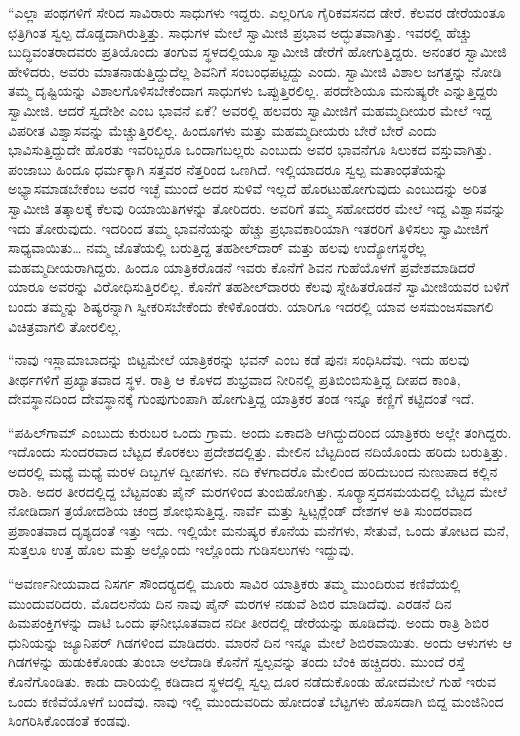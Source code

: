  “ಎಲ್ಲಾ ಪಂಥಗಳಿಗೆ ಸೇರಿದ ಸಾವಿರಾರು ಸಾಧುಗಳು ಇದ್ದರು. ಎಲ್ಲರಿಗೂ ಗೈರಿಕವಸನದ ಡೇರೆ. ಕೆಲವರ ಡೇರೆಯಂತೂ ಛತ್ರಿಗಿಂತ ಸ್ವಲ್ಪ ದೊಡ್ಡದಾಗಿರುತ್ತಿತ್ತು. ಸಾಧುಗಳ ಮೇಲೆ ಸ್ವಾಮೀಜಿ ಪ್ರಭಾವ ಅದ್ಭುತವಾಗಿತ್ತು. ಇವರಲ್ಲಿ ಹೆಚ್ಚು ಬುದ್ಧಿವಂತರಾದವರು ಪ್ರತಿಯೊಂದು ತಂಗುವ ಸ್ಥಳದಲ್ಲಿಯೂ ಸ್ವಾಮೀಜಿ ಡೇರೆಗೆ ಹೋಗುತ್ತಿದ್ದರು. ಅನಂತರ ಸ್ವಾಮೀಜಿ ಹೇಳಿದರು, ಅವರು ಮಾತನಾಡುತ್ತಿದ್ದುದೆಲ್ಲ ಶಿವನಿಗೆ ಸಂಬಂಧಪಟ್ಟದ್ದು ಎಂದು. ಸ್ವಾಮೀಜಿ ವಿಶಾಲ ಜಗತ್ತನ್ನು ನೋಡಿ ತಮ್ಮ ದೃಷ್ಟಿಯನ್ನು ವಿಶಾಲಗೊಳಿಸಬೇಕೆಂದಾಗ ಸಾಧುಗಳು ಒಪ್ಪುತ್ತಿರಲಿಲ್ಲ. ಪರದೇಶಿಯೂ ಮನುಷ್ಯರೇ ಎನ್ನುತ್ತಿದ್ದರು ಸ್ವಾಮೀಜಿ. ಆದರೆ ಸ್ವದೇಶೀ ಎಂಬ ಭಾವನೆ ಏಕೆ? ಅವರಲ್ಲಿ ಹಲವರು ಸ್ವಾಮೀಜಿಗೆ ಮಹಮ್ಮದೀಯರ ಮೇಲೆ ಇದ್ದ ವಿಪರೀತ ವಿಶ್ವಾಸವನ್ನು ಮೆಚ್ಚುತ್ತಿರಲಿಲ್ಲ. ಹಿಂದೂಗಳು ಮತ್ತು ಮಹಮ್ಮದೀಯರು ಬೇರೆ ಬೇರೆ ಎಂದು ಭಾವಿಸುತ್ತಿದ್ದುದೇ ಹೊರತು ಇವರಿಬ್ಬರೂ ಒಂದಾಗಬಲ್ಲರು ಎಂಬುದು ಅವರ ಭಾವನೆಗೂ ಸಿಲುಕದ ವಸ್ತುವಾಗಿತ್ತು. ಪಂಜಾಬು ಹಿಂದೂ ಧರ್ಮಕ್ಕಾಗಿ ಸತ್ತವರ ನೆತ್ತರಿಂದ ಒಣಗಿದೆ. ಇಲ್ಲಿಯಾದರೂ ಸ್ವಲ್ಪ ಮತಾಂಧತೆಯನ್ನು ಅಭ್ಯಾಸಮಾಡಬೇಕೆಂಬ ಅವರ ಇಚ್ಛೆ ಮುಂದೆ ಅದರ ಸುಳಿವೆ ಇಲ್ಲದೆ ಹೊರಟುಹೋಗುವುದು ಎಂಬುದನ್ನು ಅರಿತ ಸ್ವಾಮೀಜಿ ತತ್ಕಾಲಕ್ಕೆ ಕೆಲವು ರಿಯಾಯಿತಿಗಳನ್ನು ತೋರಿದರು. ಅವರಿಗೆ ತಮ್ಮ ಸಹೋದರರ ಮೇಲೆ ಇದ್ದ ವಿಶ್ವಾಸವನ್ನು ಇದು ತೋರುವುದು. ಇದರಿಂದ ತಮ್ಮ ಭಾವನೆಯನ್ನು ಹೆಚ್ಚು ಪ್ರಭಾವಕಾರಿಯಾಗಿ ಇತರರಿಗೆ ತಿಳಿಸಲು ಸ್ವಾಮೀಜಿಗೆ ಸಾಧ್ಯವಾಯಿತು… ನಮ್ಮ ಜೊತೆಯಲ್ಲಿ ಬರುತ್ತಿದ್ದ ತಹಶೀಲ್‍ದಾರ್ ಮತ್ತು ಹಲವು ಉದ್ಯೋಗಸ್ಥರೆಲ್ಲ ಮಹಮ್ಮದೀಯರಾಗಿದ್ದರು. ಹಿಂದೂ ಯಾತ್ರಿಕರೊಡನೆ ಇವರು ಕೊನೆಗೆ ಶಿವನ ಗುಹೆಯೊಳಗೆ ಪ್ರವೇಶಮಾಡಿದರೆ ಯಾರೂ ಅವರನ್ನು ವಿರೋಧಿಸುತ್ತಿರಲಿಲ್ಲ. ಕೊನೆಗೆ ತಹಶೀಲ್‍ದಾರರು ಕೆಲವು ಸ್ನೇಹಿತರೊಡನೆ ಸ್ವಾಮೀಜಿಯವರ ಬಳಿಗೆ ಬಂದು ತಮ್ಮನ್ನು ಶಿಷ್ಯರನ್ನಾಗಿ ಸ್ವೀಕರಿಸಬೇಕೆಂದು ಕೇಳಿಕೊಂಡರು. ಯಾರಿಗೂ ಇದರಲ್ಲಿ ಯಾವ ಅಸಮಂಜಸವಾಗಲಿ ವಿಚಿತ್ರವಾಗಲಿ ತೋರಲಿಲ್ಲ.

 “ನಾವು ಇಸ್ಲಾಮಾಬಾದನ್ನು ಬಿಟ್ಟಮೇಲೆ ಯಾತ್ರಿಕರನ್ನು ಭವನ್ ಎಂಬ ಕಡೆ ಪುನಃ ಸಂಧಿಸಿದೆವು. ಇದು ಹಲವು ತೀರ್ಥಗಳಿಗೆ ಪ್ರಖ್ಯಾತವಾದ ಸ್ಥಳ. ರಾತ್ರಿ ಆ ಕೊಳದ ಶುಭ್ರವಾದ ನೀರಿನಲ್ಲಿ ಪ್ರತಿಬಿಂಬಿಸುತ್ತಿದ್ದ ದೀಪದ ಕಾಂತಿ, ದೇವಸ್ಥಾನದಿಂದ ದೇವಸ್ಥಾನಕ್ಕೆ ಗುಂಪುಗುಂಪಾಗಿ ಹೋಗುತ್ತಿದ್ದ ಯಾತ್ರಿಕರ ತಂಡ ಇನ್ನೂ ಕಣ್ಣಿಗೆ ಕಟ್ಟಿದಂತೆ ಇದೆ.

 “ಪಹಿಲ್‍ಗಾಮ್ ಎಂಬುದು ಕುರುಬರ ಒಂದು ಗ್ರಾಮ. ಅಂದು ಏಕಾದಶಿ ಆಗಿದ್ದುದರಿಂದ ಯಾತ್ರಿಕರು ಅಲ್ಲೇ ತಂಗಿದ್ದರು. ಇದೊಂದು ಸುಂದರವಾದ ಬೆಟ್ಟದ ಕೊರಕಲು ಪ್ರದೇಶದಲ್ಲಿತ್ತು. ಮೇಲಿನ ಬೆಟ್ಟದಿಂದ ನದಿಯೊಂದು ಹರಿದು ಬರುತ್ತಿತ್ತು. ಅದರಲ್ಲಿ ಮಧ್ಯೆ ಮಧ್ಯೆ ಮರಳ ದಿಬ್ಬಗಳ ದ್ವೀಪಗಳು. ನದಿ ಕೆಳಗಾದರೊ ಮೇಲಿಂದ ಹರಿದುಬಂದ ನುಣುಪಾದ ಕಲ್ಲಿನ ರಾಶಿ. ಅದರ ತೀರದಲ್ಲಿದ್ದ ಬೆಟ್ಟವಂತು ಪೈನ್ ಮರಗಳಿಂದ ತುಂಬಿಹೋಗಿತ್ತು. ಸೂರ‍್ಯಾಸ್ತದಸಮಯದಲ್ಲಿ ಬೆಟ್ಟದ ಮೇಲೆ ನೋಡಿದಾಗ ತ್ರಯೋದಶಿಯ ಚಂದ್ರ ಶೋಭಿಸುತ್ತಿದ್ದ. ನಾರ್ವೆ ಮತ್ತು ಸ್ವಿಟ್ಸರ್‍ಲೆಂಡ್ ದೇಶಗಳ ಅತಿ ಸುಂದರವಾದ ಪ್ರಶಾಂತವಾದ ದೃಶ್ಯದಂತೆ ಇತ್ತು ಇದು. ಇಲ್ಲಿಯೇ ಮನುಷ್ಯರ ಕೊನೆಯ ಮನೆಗಳು, ಸೇತುವೆ, ಒಂದು ತೋಟದ ಮನೆ, ಸುತ್ತಲೂ ಉತ್ತ ಹೊಲ ಮತ್ತು ಅಲ್ಲೊಂದು ಇಲ್ಲೊಂದು ಗುಡಿಸಲುಗಳು ಇದ್ದುವು.

 “ಅವರ್ಣನೀಯವಾದ ನಿಸರ್ಗ ಸೌಂದರ‍್ಯದಲ್ಲಿ ಮೂರು ಸಾವಿರ ಯಾತ್ರಿಕರು ತಮ್ಮ ಮುಂದಿರುವ ಕಣಿವೆಯಲ್ಲಿ ಮುಂದುವರಿದರು. ಮೊದಲನೆಯ ದಿನ ನಾವು ಪೈನ್ ಮರಗಳ ನಡುವೆ ಶಿಬಿರ ಮಾಡಿದೆವು. ಎರಡನೆ ದಿನ ಹಿಮಪಂಕ್ತಿಗಳನ್ನು ದಾಟಿ ಒಂದು ಘನೀಭೂತವಾದ ನದೀ ತೀರದಲ್ಲಿ ಡೇರೆಯನ್ನು ಹೂಡಿದೆವು. ಅಂದು ರಾತ್ರಿ ಶಿಬಿರ ಧುನಿಯನ್ನು ಜ್ಯೂನಿಪರ್ ಗಿಡಗಳಿಂದ ಮಾಡಿದರು. ಮಾರನೆ ದಿನ ಇನ್ನೂ ಮೇಲೆ ಶಿಬಿರವಾಯಿತು. ಅಂದು ಆಳುಗಳು ಆ ಗಿಡಗಳನ್ನು ಹುಡುಕಿಕೊಂಡು ತುಂಬಾ ಅಲೆದಾಡಿ ಕೊನೆಗೆ ಸ್ವಲ್ಪವನ್ನು ತಂದು ಬೆಂಕಿ ಹಚ್ಚಿದರು. ಮುಂದೆ ರಸ್ತೆ ಕೊನೆಗೊಂಡಿತು. ಕಾಡು ದಾರಿಯಲ್ಲಿ ಕಡಿದಾದ ಸ್ಥಳದಲ್ಲಿ ಸ್ವಲ್ಪ ದೂರ ನಡೆದುಕೊಂಡು ಹೋದಮೇಲೆ ಗುಹೆ ಇರುವ ಒಂದು ಕಣಿವೆಯೊಳಗೆ ಬಂದೆವು. ನಾವು ಇಲ್ಲಿ ಮುಂದುವರಿದು ಹೋದಂತೆ ಬೆಟ್ಟಗಳು ಹೊಸದಾಗಿ ಬಿದ್ದ ಮಂಜಿನಿಂದ ಸಿಂಗರಿಸಿಕೊಂಡಂತೆ ಕಂಡವು.

